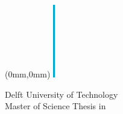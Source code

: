 
%
%
%
%

\begin{textblock*}{210mm}(0mm,0mm)
\noindent
\includegraphics[height=3.2cm]{template-pics/block} %
\sffamily
\vspace{.8cm}

\begin{center}

\Large
Delft University of Technology\\
Master of Science Thesis in \reportMSC\\
\vspace{2cm}
\parbox{170mm}{\bfseries\centering\Huge\reportTitle}\\
\vspace{1cm}
\parbox{170mm}{\bfseries\centering\reportAuthor}

\end{center}
\end{textblock*}

